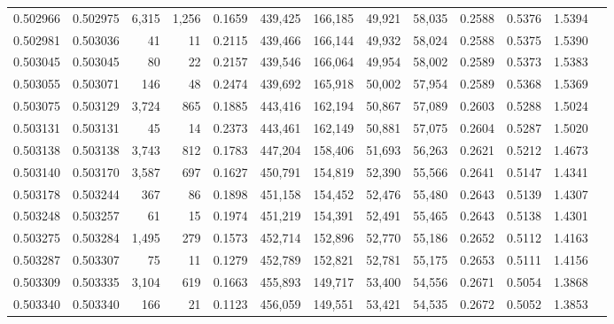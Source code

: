 \begin{tabular}{rrrrrrrrrrrrr}
0.502966 & 0.502975 & 6,315 & 1,256 &                                     0.1659 & 439,425 & 166,185 &  49,921 &  58,035 & 0.2588 & 0.5376 & 1.5394 \\
0.502981 & 0.503036 &    41 &    11 &                                     0.2115 & 439,466 & 166,144 &  49,932 &  58,024 & 0.2588 & 0.5375 & 1.5390 \\
0.503045 & 0.503045 &    80 &    22 &                                     0.2157 & 439,546 & 166,064 &  49,954 &  58,002 & 0.2589 & 0.5373 & 1.5383 \\
0.503055 & 0.503071 &   146 &    48 &                                     0.2474 & 439,692 & 165,918 &  50,002 &  57,954 & 0.2589 & 0.5368 & 1.5369 \\
0.503075 & 0.503129 & 3,724 &   865 &                                     0.1885 & 443,416 & 162,194 &  50,867 &  57,089 & 0.2603 & 0.5288 & 1.5024 \\
0.503131 & 0.503131 &    45 &    14 &                                     0.2373 & 443,461 & 162,149 &  50,881 &  57,075 & 0.2604 & 0.5287 & 1.5020 \\
0.503138 & 0.503138 & 3,743 &   812 &                                     0.1783 & 447,204 & 158,406 &  51,693 &  56,263 & 0.2621 & 0.5212 & 1.4673 \\
0.503140 & 0.503170 & 3,587 &   697 &                                     0.1627 & 450,791 & 154,819 &  52,390 &  55,566 & 0.2641 & 0.5147 & 1.4341 \\
0.503178 & 0.503244 &   367 &    86 &                                     0.1898 & 451,158 & 154,452 &  52,476 &  55,480 & 0.2643 & 0.5139 & 1.4307 \\
0.503248 & 0.503257 &    61 &    15 &                                     0.1974 & 451,219 & 154,391 &  52,491 &  55,465 & 0.2643 & 0.5138 & 1.4301 \\
0.503275 & 0.503284 & 1,495 &   279 &                                     0.1573 & 452,714 & 152,896 &  52,770 &  55,186 & 0.2652 & 0.5112 & 1.4163 \\
0.503287 & 0.503307 &    75 &    11 &                                     0.1279 & 452,789 & 152,821 &  52,781 &  55,175 & 0.2653 & 0.5111 & 1.4156 \\
0.503309 & 0.503335 & 3,104 &   619 &                                     0.1663 & 455,893 & 149,717 &  53,400 &  54,556 & 0.2671 & 0.5054 & 1.3868 \\
0.503340 & 0.503340 &   166 &    21 &                                     0.1123 & 456,059 & 149,551 &  53,421 &  54,535 & 0.2672 & 0.5052 & 1.3853 \\

\end{tabular}
